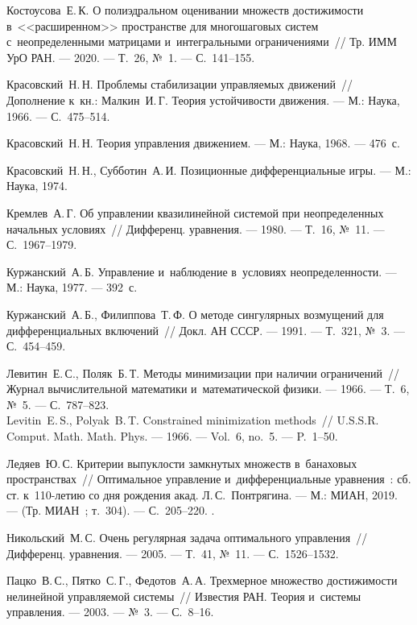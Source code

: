 \documentclass[../main.tex]{subfiles}
\begin{document}
\begin{thebibliography}{99}
Костоусова~Е.\,К. О полиэдральном оценивании множеств достижимости в~<<расширенном>> пространстве для многошаговых систем с~неопределенными матрицами и~интегральными ограничениями~// Тр. ИММ УрО РАН. --- 2020. --- Т.~26, №~1. --- С.~141--155.

Красовский~Н.\,Н. Проблемы стабилизации управляемых движений~// Дополнение к~кн.: Малкин~И.\,Г. Теория устойчивости движения. --- М.: Наука, 1966. --- С.~475--514.

Красовский~Н.\,Н. Теория управления движением. --- М.: Наука, 1968. --- 476~с.

Красовский~Н.\,Н., Субботин~А.\,И. Позиционные дифференциальные игры. --- М.: Наука, 1974.

Кремлев~А.\,Г. Об управлении квазилинейной системой при неопределенных начальных условиях~// Дифференц. уравнения. --- 1980. --- Т.~16, №~11. --- С.~1967--1979.

Куржанский~А.\,Б. Управление и~наблюдение в~условиях неопределенности. --- М.: Наука, 1977. --- 392~с.

Куржанский~А.\,Б., Филиппова~Т.\,Ф. О методе сингулярных возмущений для дифференциальных включений~// Докл. АН СССР. --- 1991. --- Т.~321, №~3. --- С.~454--459.

Левитин~Е.\,С., Поляк~Б.\,Т. Методы минимизации при наличии ограничений~// Журнал вычислительной математики и~математической физики. --- 1966. --- Т.~6, №~5. --- С.~787--823.
\\
Levitin~E.\,S., Polyak~B.\,T. Constrained minimization methods~// U.S.S.R. Comput. Math. Math. Phys. --- 1966. --- Vol.~6, no.~5. --- P.~1--50. 

Ледяев~Ю.\,С. Критерии выпуклости замкнутых множеств в~банаховых пространствах~// Оптимальное управление и~дифференциальные уравнения~: сб. ст. к~110-летию со дня рождения акад. Л.\,С.~Понтрягина. --- М.: МИАН, 2019. --- (Тр. МИАН~; т.~304). --- С.~205--220. 
.

Никольский~М.\,С. Очень регулярная задача оптимального управления~// Дифференц. уравнения. --- 2005. --- Т.~41, №~11. --- С.~1526--1532.

Пацко~В.\,С., Пятко~С.\,Г., Федотов~А.\,А. Трехмерное множество достижимости нелинейной управляемой системы~// Известия РАН. Теория и~системы управления. --- 2003. --- №~3. --- С.~8--16.


\end{thebibliography}
\end{document}
